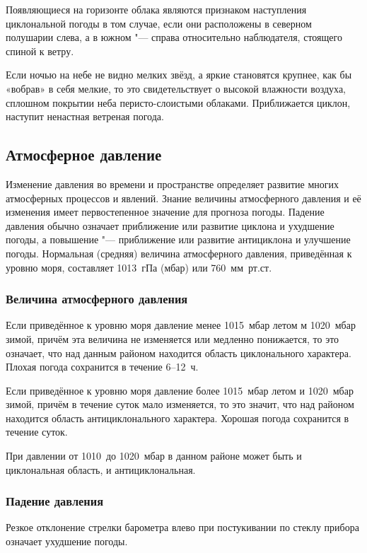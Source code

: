  Появляющиеся на горизонте облака являются признаком наступления
циклональной погоды в том случае, если они расположены в северном
полушарии слева, а в южном "--- справа относительно наблюдателя, стоящего
спиной к ветру.

 Если ночью на небе не видно мелких звёзд, а яркие становятся
крупнее, как бы «вобрав» в себя мелкие, то это свидетельствует о
высокой влажности воздуха, сплошном покрытии неба перисто-слоистыми
облаками. Приближается циклон, наступит ненастная ветреная погода.

\subsection{Атмосферное давление}

Изменение давления во времени и пространстве определяет развитие
многих атмосферных процессов и явлений. Знание величины атмосферного
давления и её изменения имеет первостепенное значение для прогноза
погоды. Падение давления обычно означает приближение или развитие
циклона и ухудшение погоды, а повышение "--- приближение или развитие
антициклона и улучшение погоды. Нормальная (средняя) величина
атмосферного давления, приведённая к уровню моря, составляет 1013~гПа
(мбар) или 760~мм~рт.ст.

\subsubsection{Величина атмосферного давления}

 Если приведённое к уровню моря давление менее 1015~мбар летом
м 1020~мбар зимой, причём эта величина не изменяется или медленно
понижается, то это означает, что над данным районом находится область
циклонального характера. Плохая погода сохранится в течение 6--12~ч.

 Если приведённое к уровню моря давление более 1015~мбар летом
и 1020~мбар зимой, причём в течение суток мало изменяется, то это
значит, что над районом находится область антициклонального
характера. Хорошая погода сохранится в течение суток.

 При давлении от 1010~до 1020~мбар в данном районе может быть и
циклональная область, и антициклональная.

\subsubsection{Падение давления}

 Резкое отклонение стрелки барометра влево при постукивании по
стеклу прибора означает ухудшение погоды.

